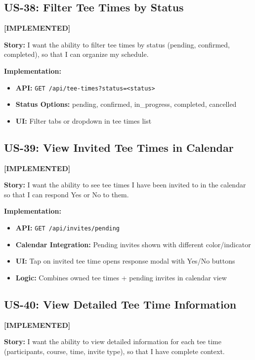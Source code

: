\documentclass[11pt,a4paper]{article}
\newcommand{\implemented}{\textcolor{implemented}{\textbf{[IMPLEMENTED]}}}
\begin{document}
\subsection{US-38: Filter Tee Times by Status}
\implemented

\textbf{Story:} I want the ability to filter tee times by status (pending, confirmed, completed), so that I can organize my schedule.

\textbf{Implementation:}
\begin{itemize}[leftmargin=*]
  \item \textbf{API:} \texttt{GET /api/tee-times?status=<status>}
  \item \textbf{Status Options:} pending, confirmed, in\_progress, completed, cancelled
  \item \textbf{UI:} Filter tabs or dropdown in tee times list
\end{itemize}

\subsection{US-39: View Invited Tee Times in Calendar}
\implemented

\textbf{Story:} I want the ability to see tee times I have been invited to in the calendar so that I can respond Yes or No to them.

\textbf{Implementation:}
\begin{itemize}[leftmargin=*]
  \item \textbf{API:} \texttt{GET /api/invites/pending}
  \item \textbf{Calendar Integration:} Pending invites shown with different color/indicator
  \item \textbf{UI:} Tap on invited tee time opens response modal with Yes/No buttons
  \item \textbf{Logic:} Combines owned tee times + pending invites in calendar view
\end{itemize}

\subsection{US-40: View Detailed Tee Time Information}
\implemented

\textbf{Story:} I want the ability to view detailed information for each tee time (participants, course, time, invite type), so that I have complete context.
\end{document}
